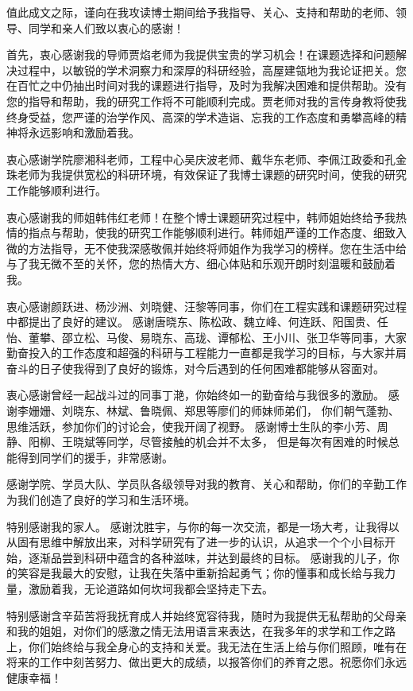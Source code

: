 
\begin{ack}
值此成文之际，谨向在我攻读博士期间给予我指导、关心、支持和帮助的老师、领导、同学和亲人们致以衷心的感谢！

首先，衷心感谢我的导师贾焰老师为我提供宝贵的学习机会！在课题选择和问题解决过程中，以敏锐的学术洞察力和深厚的科研经验，高屋建瓴地为我论证把关。您在百忙之中仍抽出时间对我的课题进行指导，及时为我解决困难和提供帮助。没有您的指导和帮助，我的研究工作将不可能顺利完成。贾老师对我的言传身教将使我终身受益，您严谨的治学作风、高深的学术造诣、忘我的工作态度和勇攀高峰的精神将永远影响和激励着我。

衷心感谢学院廖湘科老师，工程中心吴庆波老师、戴华东老师、李佩江政委和孔金珠老师为我提供宽松的科研环境，有效保证了我博士课题的研究时间，使我的研究工作能够顺利进行。

衷心感谢我的师姐韩伟红老师！在整个博士课题研究过程中，韩师姐始终给予我热情的指点与帮助，使我的研究工作能够顺利进行。韩师姐严谨的工作态度、细致入微的方法指导，无不使我深感敬佩并始终将师姐作为我学习的榜样。您在生活中给与了我无微不至的关怀，您的热情大方、细心体贴和乐观开朗时刻温暖和鼓励着我。

衷心感谢颜跃进、杨沙洲、刘晓健、汪黎等同事，你们在工程实践和课题研究过程中都提出了良好的建议。
感谢唐晓东、陈松政、魏立峰、何连跃、阳国贵、任怡、董攀、邵立松、马俊、易晓东、高珑、谭郁松、王小川、张卫华等同事，大家勤奋投入的工作态度和超强的科研与工程能力一直都是我学习的目标，与大家并肩奋斗的日子使我得到了良好的锻炼，对今后遇到的任何困难都能够从容面对。

衷心感谢曾经一起战斗过的同事丁滟，你始终如一的勤奋给与我很多的激励。
感谢李姗姗、刘晓东、林斌、鲁晓佩、郑思等廖们的师妹师弟们，
你们朝气蓬勃、思维活跃，参加你们的讨论会，使我开阔了视野。
感谢博士生队的李小芳、周静、阳柳、王晓斌等同学，尽管接触的机会并不太多，
但是每次有困难的时候总能得到同学们的援手，非常感谢。

感谢学院、学员大队、学员队各级领导对我的教育、关心和帮助，你们的辛勤工作为我们创造了良好的学习和生活环境。

特别感谢我的家人。
感谢沈胜宇，与你的每一次交流，都是一场大考，让我得以从固有思维中解放出来，对科学研究有了进一步的认识，从追求一个个小目标开始，逐渐品尝到科研中蕴含的各种滋味，并达到最终的目标。
感谢我的儿子，你的笑容是我最大的安慰，让我在失落中重新拾起勇气；你的懂事和成长给与我力量，激励着我，无论道路如何坎坷我都会坚持走下去。

特别感谢含辛茹苦将我抚育成人并始终宽容待我，随时为我提供无私帮助的父母亲和我的姐姐，对你们的感激之情无法用语言来表达，在我多年的求学和工作之路上，你们始终给与我全身心的支持和关爱。我无法在生活上给与你们照顾，唯有在将来的工作中刻苦努力、做出更大的成绩，以报答你们的养育之恩。祝愿你们永远健康幸福！
\end{ack}
